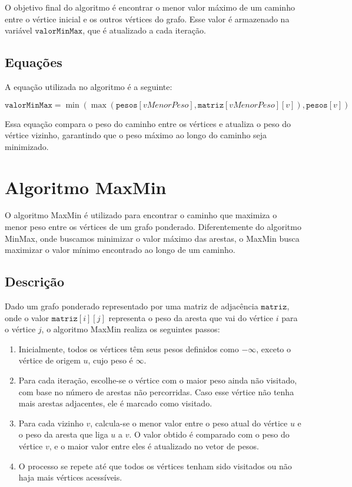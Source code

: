 \documentclass[12pt]{article}
\begin{document}
O objetivo final do algoritmo é encontrar o menor valor máximo de um caminho entre o vértice inicial e os outros vértices do grafo. Esse valor é armazenado na variável \( \texttt{valorMinMax} \), que é atualizado a cada iteração.

\subsection{Equações}

A equação utilizada no algoritmo é a seguinte:

\[
\texttt{valorMinMax} = \min \left( \max(\texttt{pesos}[vMenorPeso],  \texttt{matriz}[vMenorPeso][v]),  \texttt{pesos}[v] \right)
\]

\noindent Essa equação compara o peso do caminho entre os vértices e atualiza o peso do vértice vizinho, garantindo que o peso máximo ao longo do caminho seja minimizado.

\section{Algoritmo MaxMin}

O algoritmo MaxMin é utilizado para encontrar o caminho que maximiza o menor peso entre os vértices de um grafo ponderado. Diferentemente do algoritmo MinMax, onde buscamos minimizar o valor máximo das arestas, o MaxMin busca maximizar o valor mínimo encontrado ao longo de um caminho.

\subsection{Descrição}

Dado um grafo ponderado representado por uma matriz de adjacência \( \texttt{matriz} \), onde o valor \( \texttt{matriz}[i][j] \) representa o peso da aresta que vai do vértice \( i \) para o vértice \( j \), o algoritmo MaxMin realiza os seguintes passos:

\begin{enumerate}
    \item Inicialmente, todos os vértices têm seus pesos definidos como \( -\infty \), exceto o vértice de origem \( u \), cujo peso é \( \infty \).
    \item Para cada iteração, escolhe-se o vértice com o maior peso ainda não visitado, com base no número de arestas não percorridas. Caso esse vértice não tenha mais arestas adjacentes, ele é marcado como visitado.
    \item Para cada vizinho \( v \), calcula-se o menor valor entre o peso atual do vértice \( u \) e o peso da aresta que liga \( u \) a \( v \). O valor obtido é comparado com o peso do vértice \( v \), e o maior valor entre eles é atualizado no vetor de pesos.
    \item O processo se repete até que todos os vértices tenham sido visitados ou não haja mais vértices acessíveis.
\end{enumerate}
\end{document}
